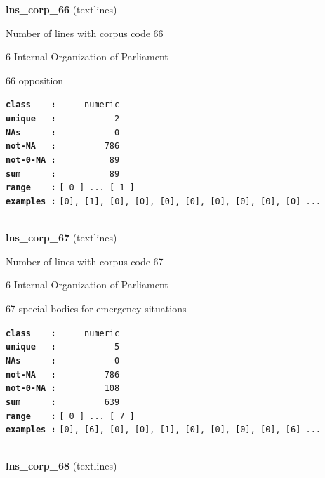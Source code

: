 \documentclass[]{article}
\begin{document}
\textbf{lns\_corp\_66} (textlines)

Number of lines with corpus code 66

6 Internal Organization of Parliament

66 opposition

\textbf{\texttt{class\ \ \ \ :}} \texttt{~~~~~numeric}\\
\textbf{\texttt{unique\ \ \ :}} \texttt{~~~~~~~~~~~2}\\
\textbf{\texttt{NAs\ \ \ \ \ \ :}} \texttt{~~~~~~~~~~~0}\\
\textbf{\texttt{not-NA\ \ \ :}} \texttt{~~~~~~~~~786}\\
\textbf{\texttt{not-0-NA\ :}} \texttt{~~~~~~~~~~89}\\
\textbf{\texttt{sum\ \ \ \ \ \ :}} \texttt{~~~~~~~~~~89}\\
\textbf{\texttt{range\ \ \ \ :}}
\texttt{{[}\ 0\ {]}\ ...\ {[}\ 1\ {]}}\\
\textbf{\texttt{examples\ :}}
\texttt{{[}0{]},\ {[}1{]},\ {[}0{]},\ {[}0{]},\ {[}0{]},\ {[}0{]},\ {[}0{]},\ {[}0{]},\ {[}0{]},\ {[}0{]}\ ...}\\

~

\textbf{lns\_corp\_67} (textlines)

Number of lines with corpus code 67

6 Internal Organization of Parliament

67 special bodies for emergency situations

\textbf{\texttt{class\ \ \ \ :}} \texttt{~~~~~numeric}\\
\textbf{\texttt{unique\ \ \ :}} \texttt{~~~~~~~~~~~5}\\
\textbf{\texttt{NAs\ \ \ \ \ \ :}} \texttt{~~~~~~~~~~~0}\\
\textbf{\texttt{not-NA\ \ \ :}} \texttt{~~~~~~~~~786}\\
\textbf{\texttt{not-0-NA\ :}} \texttt{~~~~~~~~~108}\\
\textbf{\texttt{sum\ \ \ \ \ \ :}} \texttt{~~~~~~~~~639}\\
\textbf{\texttt{range\ \ \ \ :}}
\texttt{{[}\ 0\ {]}\ ...\ {[}\ 7\ {]}}\\
\textbf{\texttt{examples\ :}}
\texttt{{[}0{]},\ {[}6{]},\ {[}0{]},\ {[}0{]},\ {[}1{]},\ {[}0{]},\ {[}0{]},\ {[}0{]},\ {[}0{]},\ {[}6{]}\ ...}\\

~

\textbf{lns\_corp\_68} (textlines)
\end{document}
